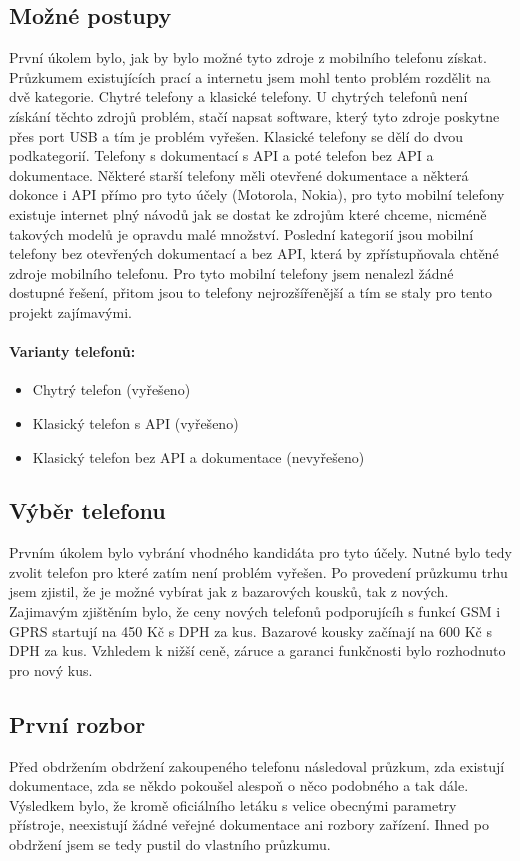 \documentclass[FM,MP]{tulthesis}  %
\begin{document}
\subsection{Možné postupy}
První úkolem bylo, jak by bylo možné tyto zdroje z mobilního telefonu získat. Průzkumem existujících prací a internetu jsem mohl tento problém rozdělit na dvě kategorie. Chytré telefony a klasické telefony. U chytrých telefonů není získání těchto zdrojů problém, stačí napsat software, který tyto zdroje poskytne přes port USB a tím je problém vyřešen. Klasické telefony se dělí do dvou podkategorií. Telefony s dokumentací s API a poté telefon bez API a dokumentace. Některé starší telefony měli otevřené dokumentace a některá dokonce i API přímo pro tyto účely (Motorola, Nokia), pro tyto mobilní telefony existuje internet plný návodů jak se dostat ke zdrojům které chceme, nicméně takových modelů je opravdu malé množství. Poslední kategorií jsou mobilní telefony bez otevřených dokumentací a bez API, která by zpřístupňovala chtěné zdroje mobilního telefonu. Pro tyto mobilní telefony jsem nenalezl žádné dostupné řešení, přitom jsou to telefony nejrozšířenější a tím se staly pro tento projekt zajímavými.

\paragraph{Varianty telefonů:}
\begin{itemize}
\item Chytrý telefon (vyřešeno)
\item Klasický telefon s API (vyřešeno)
\item Klasický telefon bez API a dokumentace (nevyřešeno)
\end{itemize} 

\subsection{Výběr telefonu}
Prvním úkolem bylo vybrání vhodného kandidáta pro tyto účely. Nutné bylo tedy zvolit telefon pro které zatím není problém vyřešen. Po provedení průzkumu trhu jsem zjistil, že je možné vybírat jak z bazarových kousků, tak z nových. Zajimavým zjištěním bylo, že ceny nových telefonů podporujícíh s funkcí GSM i GPRS startují na 450 Kč s DPH za kus. Bazarové kousky začínají na 600 Kč s DPH za kus. Vzhledem k nižší ceně, záruce a garanci funkčnosti bylo rozhodnuto pro nový kus.

\subsection{První rozbor}
Před obdržením obdržení zakoupeného telefonu následoval průzkum, zda existují dokumentace, zda se někdo pokoušel alespoň o něco podobného a tak dále. Výsledkem bylo, že kromě oficiálního letáku s velice obecnými parametry přístroje, neexistují žádné veřejné dokumentace ani rozbory zařízení. Ihned po obdržení jsem se tedy pustil do vlastního průzkumu.
\end{document}
